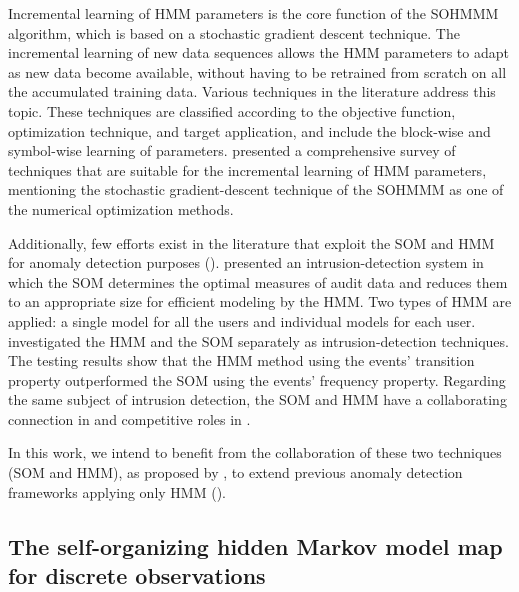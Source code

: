 Incremental learning of HMM parameters is the core function of the SOHMMM algorithm, which is based on a stochastic gradient descent technique. The incremental learning of new data sequences allows the HMM parameters to adapt as new data become available, without having to be retrained from scratch on all the accumulated training data. Various techniques in the literature address this topic. These techniques are classified according to the objective function, optimization technique, and target application, and include the block-wise and symbol-wise learning of parameters. \citet{Khreich2012} presented a comprehensive survey of techniques that are suitable for the incremental learning of HMM parameters, mentioning the stochastic gradient-descent technique of the SOHMMM as one of the numerical optimization methods.

Additionally, few efforts exist in the literature that exploit the SOM and HMM for anomaly detection purposes (\citet{Cho2002,Wang2006}). \citet{Cho2002} presented an intrusion-detection system in which the SOM determines the optimal measures of audit data and reduces them to an appropriate size for efficient modeling by the HMM. Two types of HMM are applied: a single model for all the users and individual models for each user. \citet{Wang2006} investigated the HMM and the SOM separately as intrusion-detection techniques. The testing results show that the HMM method using the events' transition property outperformed the SOM using the events' frequency property. Regarding the same subject of intrusion detection, the SOM and HMM have a collaborating connection in \cite{Cho2002} and competitive roles in \cite{Wang2006}.

In this work, we intend to benefit from the collaboration of these two techniques (SOM and HMM), as proposed by \citet{Ferles2008}, to extend previous anomaly detection frameworks applying only HMM (\citet{Anisa2014,Anisa2017,Anisa2019}).

\subsection{The self-organizing hidden Markov model map for discrete observations}
\label{sec:sohmmm_background}

